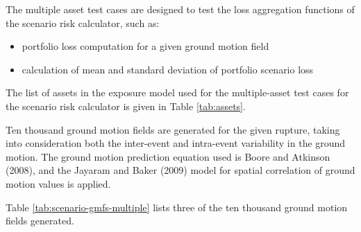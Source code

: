 The multiple asset test cases are designed to test the loss aggregation functions of the scenario risk calculator, such as:

\begin{itemize}
\item portfolio loss computation for a given ground motion field
\item calculation of mean and standard deviation of portfolio scenario loss
\end{itemize}



The list of assets in the exposure model used for the multiple-asset test cases for the scenario risk calculator is given in Table \ref{tab:assets}.

Ten thousand ground motion fields are generated for the given rupture, taking into consideration both the inter-event and intra-event variability in the ground motion. The ground motion prediction equation used is Boore and Atkinson (2008), and the Jayaram and Baker (2009) model for spatial correlation of ground motion values is applied.



Table \ref{tab:scenario-gmfs-multiple} lists three of the ten thousand ground motion fields generated.